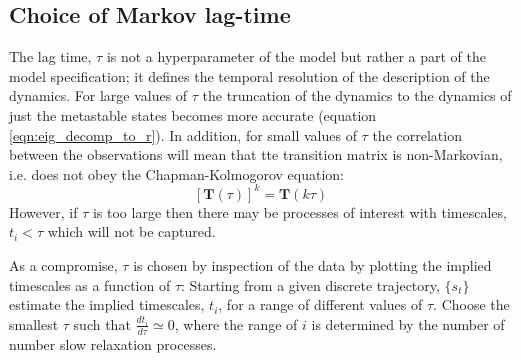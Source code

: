 \subsection{Choice of Markov lag-time}
The lag time, $\tau$ is not a hyperparameter of the model but rather a part of the model specification; it defines the temporal resolution of the description of the dynamics. For large values of $\tau$ the truncation of the dynamics to the dynamics of just the metastable states becomes more accurate (equation \ref{eqn:eig_decomp_to_r}). \cite{prinzMarkovModelsMolecular2011} In addition, for small values of $\tau$ the correlation between the observations will mean that tte transition matrix is non-Markovian, i.e. does not obey the Chapman-Kolmogorov equation:
\begin{equation}\label{eqn:ck_eqn}
[\mathbf{T}(\tau)]^{k} = \mathbf{T}(k \tau)
\end{equation}
However, if $\tau$ is too large then there may be processes of interest with timescales, $t_{i}<\tau$ which will not be captured.  \cite{prinzMarkovModelsMolecular2011}

As a compromise, $\tau$ is chosen by inspection of the data by plotting the implied timescales as a function of $\tau$: \cite{prinzMarkovModelsMolecular2011}\cite{swopeDescribingProteinFolding2004a}  Starting from a given discrete trajectory, $\{s_{t}\}$ estimate the implied timescales, $t_{i}$, for a range of different values of $\tau$. Choose the smallest $\tau$ such that $\frac{d t_{i}}{d \tau} \simeq 0$, where the range of $i$ is determined by the number of number slow relaxation processes. 


